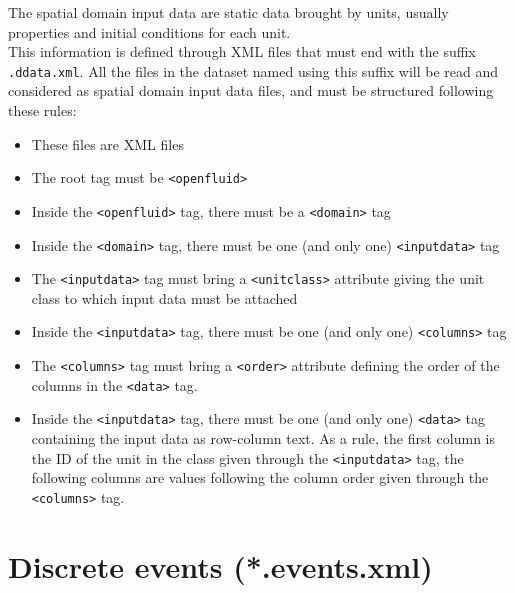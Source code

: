The spatial domain input data are static data brought by units, usually properties and initial conditions for each unit.\\
\noindent This information is defined through XML files that must end with the suffix \texttt{.ddata.xml}.
All the files in the dataset named using this suffix will be read and considered as spatial domain input data files, and must be
structured following these rules:
\begin{itemize}
  \item These files are XML files
  \item The root tag must be \texttt{<openfluid>}
  \item Inside the \texttt{<openfluid>} tag, there must be a \texttt{<domain>} tag
  \item Inside the \texttt{<domain>} tag, there must be one (and only one) \texttt{<inputdata>} tag
  \item The \texttt{<inputdata>} tag must bring a \texttt{<unitclass>} attribute giving the unit class to which input data must be attached 
  \item Inside the \texttt{<inputdata>} tag, there must be one (and only one) \texttt{<columns>} tag
  \item The \texttt{<columns>} tag must bring a \texttt{<order>} attribute defining the order of the columns in the \texttt{<data>} tag.
  \item Inside the \texttt{<inputdata>} tag, there must be one (and only one) \texttt{<data>} tag containing the input data as row-column text. As a rule, the first column is the ID of the unit in the class given through the \texttt{<inputdata>} tag, the following columns are values following the column order given through the \texttt{<columns>} tag.   
\end{itemize}


\bigskip

\section{Discrete events (*.events.xml)}

